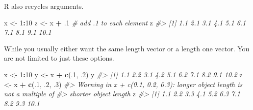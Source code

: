 \documentclass[]{book}
\newenvironment{Shaded}{\begin{snugshade}}{\end{snugshade}}
\newcommand{\CommentTok}[1]{\textcolor[rgb]{0.56,0.35,0.01}{\textit{#1}}}
\newcommand{\DecValTok}[1]{\textcolor[rgb]{0.00,0.00,0.81}{#1}}
\newcommand{\FloatTok}[1]{\textcolor[rgb]{0.00,0.00,0.81}{#1}}
\newcommand{\KeywordTok}[1]{\textcolor[rgb]{0.13,0.29,0.53}{\textbf{#1}}}
\newcommand{\NormalTok}[1]{#1}
\newcommand{\OperatorTok}[1]{\textcolor[rgb]{0.81,0.36,0.00}{\textbf{#1}}}
\newcommand{\StringTok}[1]{\textcolor[rgb]{0.31,0.60,0.02}{#1}}
\theoremstyle{definition}
\theoremstyle{definition}
\theoremstyle{definition}
\theoremstyle{remark}
\begin{document}
\begin{Shaded}
\end{Shaded}

R also recycles arguments.

\begin{Shaded}
\begin{Highlighting}[]
\NormalTok{x <-}\StringTok{ }\DecValTok{1}\OperatorTok{:}\DecValTok{10}
\NormalTok{z <-}\StringTok{ }\NormalTok{x }\OperatorTok{+}\StringTok{ }\FloatTok{.1}  \CommentTok{# add .1 to each element}
\NormalTok{z}
\CommentTok{#>  [1]  1.1  2.1  3.1  4.1  5.1  6.1  7.1  8.1  9.1 10.1}
\end{Highlighting}
\end{Shaded}

While you usually either want the same length vector or a length one
vector. You are not limited to just these options.

\begin{Shaded}
\begin{Highlighting}[]
\NormalTok{x <-}\StringTok{ }\DecValTok{1}\OperatorTok{:}\DecValTok{10}
\NormalTok{y <-}\StringTok{ }\NormalTok{x }\OperatorTok{+}\StringTok{ }\KeywordTok{c}\NormalTok{(.}\DecValTok{1}\NormalTok{, }\FloatTok{.2}\NormalTok{) }
\NormalTok{y}
\CommentTok{#>  [1]  1.1  2.2  3.1  4.2  5.1  6.2  7.1  8.2  9.1 10.2}
\NormalTok{z <-}\StringTok{ }\NormalTok{x }\OperatorTok{+}\StringTok{ }\KeywordTok{c}\NormalTok{(.}\DecValTok{1}\NormalTok{, }\FloatTok{.2}\NormalTok{, }\FloatTok{.3}\NormalTok{)}
\CommentTok{#> Warning in x + c(0.1, 0.2, 0.3): longer object length is not a multiple of}
\CommentTok{#> shorter object length}
\NormalTok{z}
\CommentTok{#>  [1]  1.1  2.2  3.3  4.1  5.2  6.3  7.1  8.2  9.3 10.1}
\end{Highlighting}
\end{Shaded}
\end{document}
